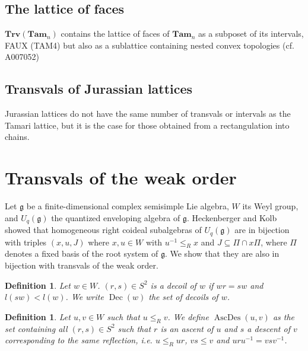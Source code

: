 \documentclass[leqno, 12pt]{amsart}
\numberwithin{equation}{section}
\newcommand{\Tam}{\mathbf{Tam}}
\newcommand{\Trv}{\mathbf{Trv}}
\newcommand{\AD}{\operatorname{AscDes}}
\newcommand{\Dec}{\operatorname{Dec}}
\numberwithin{equation}{section}
\newtheorem{defi}[thm]{Definition}
\theoremstyle{remark}
\begin{document}
\subsection{The lattice of faces}
	
$\Trv(\Tam_n)$  contains the lattice of faces of $\Tam_n $ as a subposet of its intervals, {\color{red} FAUX (TAM4) but also as a sublattice containing nested convex topologies (cf. A007052)}
	
\subsection{Transvals of Jurassian lattices}
   Jurassian lattices do not have the same number of transvals or intervals as the Tamari lattice, but it is the case for those obtained from a rectangulation into chains.
	
	\section{Transvals of the weak order}
	
	Let $\mathfrak g$ be a finite-dimensional complex semisimple Lie algebra, $W$ its Weyl group, and $U_q(\mathfrak g)$ the quantized enveloping algebra of $\mathfrak g$. Heckenberger and Kolb~\cite{HeKo12} showed that homogeneous right coideal subalgebras of $U_q(\mathfrak g)$ are in bijection with triples $(x,u,J)$ where $x,u\in W$ with $u^{-1}\le_R x$ and $J\subseteq \Pi\cap x\Pi$, where $\Pi$ denotes a fixed basis of the root system of $\mathfrak g$. We show that they are also in bijection with transvals of the weak order.
	
	
	\begin{defi}
		Let $w\in W$. $(r,s)\in S^2$ is a decoil of $w$ if $wr=sw$ and $l(sw)<l(w)$. We write $\Dec(w)$ the set of decoils of $w$.
	\end{defi}
	\begin{defi}
		Let $u,v \in W$ such that $u\le_Rv$. We define $\AD(u,v)$ as the set containing all $(r,s)\in S^2$ such that $r$ is an ascent of $u$ and $s$ a descent of $v$ corresponding to the same reflection, \emph{i.e.} $u\le_Rur$, $vs\le v$ and $uru^{-1}=vsv^{-1}$.
	\end{defi}
	
\end{document}
